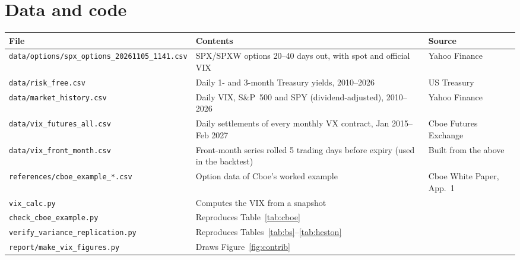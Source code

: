 \documentclass[12pt]{article}
\begin{document}
\section{Data and code}

\begin{table}[H]
\centering
\small
\footnotesize
\begin{tabular}{@{}p{6.0cm}p{4.8cm}p{2.8cm}@{}}
\toprule
\textbf{File} & \textbf{Contents} & \textbf{Source}\\
\midrule
\texttt{data/options/}\newline\texttt{spx\_options\_20261105\_1141.csv} & SPX/SPXW options 20--40 days out, with spot and official VIX & Yahoo Finance\\
\texttt{data/risk\_free.csv} & Daily 1- and 3-month Treasury yields, 2010--2026 & US Treasury\\
\texttt{data/market\_history.csv} & Daily VIX, S\&P~500 and SPY (dividend-adjusted), 2010--2026 & Yahoo Finance\\
\texttt{data/vix\_futures\_all.csv} & Daily settlements of every monthly VX contract, Jan 2015--Feb 2027 & Cboe Futures Exchange\\
\texttt{data/vix\_front\_month.csv} & Front-month series rolled 5 trading days before expiry (used in the backtest) & Built from the above\\
\texttt{references/}\newline\texttt{cboe\_example\_*.csv} & Option data of Cboe's worked example & Cboe White Paper, App.~1\\
\midrule
\texttt{vix\_calc.py} & Computes the VIX from a snapshot & \\
\texttt{check\_cboe\_example.py} & Reproduces Table~\ref{tab:cboe} & \\
\texttt{verify\_variance\_replication.py} & Reproduces Tables~\ref{tab:bs}--\ref{tab:heston} & \\
\texttt{report/make\_vix\_figures.py} & Draws Figure~\ref{fig:contrib} & \\
\bottomrule
\end{tabular}
\end{table}
\end{document}
